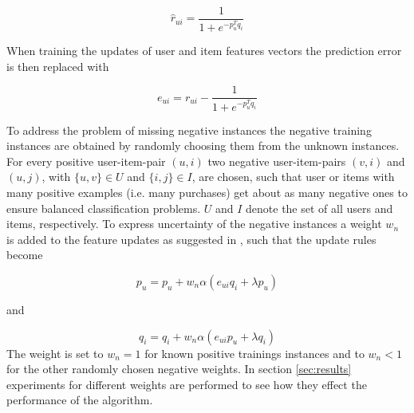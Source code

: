 \documentclass[10pt]{reportMaster}
\begin{document}
\begin{equation}
	\hat{r}_{ui} = \frac{1}{1 + e^{-p_u^Tq_i}}
\end{equation}

When training the updates of user and item features vectors the prediction error is then replaced with 

\begin{equation}
	e_{ui} = r_{ui} - \frac{1}{1 + e^{-p_u^Tq_i}}
\end{equation}

To address the problem of missing negative instances the negative training instances are obtained by randomly choosing them from the unknown instances.
For every positive user-item-pair $(u, i)$ two negative user-item-pairs $(v, i)$ and $(u,j)$, with $\{u, v\} \in U$ and $\{i, j\} \in I$, are chosen, such that user or items with many positive examples (i.e. many purchases) get about as many negative ones to ensure balanced classification problems.
$U$ and $I$ denote the set of all users and items, respectively.
To express uncertainty of the negative instances a weight $w_n$ is added to the feature updates as suggested in \cite{occf}, such that the update rules become 

\begin{equation}
	p_u = p_u + w_n \alpha (e_{ui} q_i + \lambda p_u)
\end{equation}

and 

\begin{equation}
	q_i = q_i + w_n \alpha (e_{ui} p_u + \lambda q_i)
\end{equation}
The weight is set to $w_n = 1$ for known positive trainings instances and to $w_n < 1$ for the other randomly chosen negative weights.
In section \ref{sec:results} experiments for different weights are performed to see how they effect the performance of the algorithm.
\end{document}
